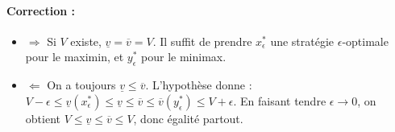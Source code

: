 \paragraph{Correction :}
\begin{itemize}
    \item $\Rightarrow$ Si $V$ existe, $\underline{v} = \overline{v} = V$. Il suffit de prendre $x^*_\epsilon$ une stratégie $\epsilon$-optimale pour le maximin, et $y^*_\epsilon$ pour le minimax.
    \item $\Leftarrow$ On a toujours $\underline{v} \le \overline{v}$.
    L'hypothèse donne : $V - \epsilon \le \underline{v}(x^*_\epsilon) \le \underline{v} \le \overline{v} \le \overline{v}(y^*_\epsilon) \le V + \epsilon$.
    En faisant tendre $\epsilon \to 0$, on obtient $V \le \underline{v} \le \overline{v} \le V$, donc égalité partout.
\end{itemize}

